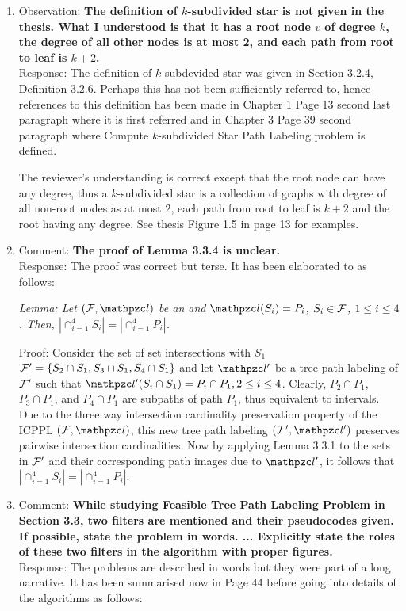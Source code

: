 \documentclass[12pt,a4paper]{article}
\begin{document}
\begin{enumerate}
\item Observation: {\bf The definition of $k$-subdivided star is not
    given in the thesis. What I understood is that it has a root node $v$
    of degree $k$, the degree of all other nodes is at most 2, and
    each path from root to leaf is $k+2$.}\\
Response: The definition of $k$-subdevided star was given in Section
3.2.4, Definition 3.2.6. Perhaps this has not been sufficiently
referred to, hence references to this definition has been made in
Chapter 1 Page 13 second last paragraph where it is first referred and
in Chapter 3 Page 39 second paragraph where {\sc Compute
  $k$-subdivided Star Path Labeling} problem is defined.

The reviewer's understanding is 
correct except that the root node can have any degree, thus a
$k$-subdivided star is a collection of graphs with degree of all
non-root nodes as at most 2, each path from root to leaf is $k+2$ and 
the root having any degree. See thesis Figure 1.5 in page 13 for examples.


\item Comment: {\bf The proof of Lemma 3.3.4 is unclear.}\\
Response: The proof was correct but terse. It has been elaborated to as
follows:

  {\em 
  Lemma:   Let $(\cF, \cl)$ be an \ICPPL and $\cl(S_i)=P_i$, $S_i \in {\cal F}$, $1
  \leq i \leq 4$.  Then, $|\cap_{i=1}^4 S_i| = |\cap_{i=1}^4 P_i|$.

  Proof: Consider the set of set intersections with $S_1$ ${\cal F}' = \{S_2 \cap S_1, S_3
  \cap S_1, S_4 \cap S_1\}$ and let $\cl'$ be a tree path labeling of
  ${\cal F}'$ such that $\cl'(S_i \cap S_1) = P_i \cap P_1, 2 \le i \le
  4$. Clearly, $P_2 \cap P_1$, $P_3 \cap P_1$, and $P_4 \cap P_1$ are
  subpaths of path $P_1$, thus equivalent to intervals.  Due to the
  three way intersection cardinality preservation property of the
  ICPPL $(\cF, \cl)$, this new tree path labeling $(\cF', \cl')$
  preserves pairwise intersection cardinalities.  Now by applying
  Lemma 3.3.1 %
  to the sets in ${\cal F}'$ and
  their corresponding path images due to $\cl'$, it follows that
  $|\cap_{i=1}^4 S_i| =| \cap_{i=1}^4 P_i|$.}


\item Comment: {\bf While studying Feasible Tree Path Labeling Problem
  in Section 3.3, two filters are mentioned and their pseudocodes
  given. If possible, state the problem in words. ... Explicitly state
the roles of these two filters in the algorithm with proper
figures.}\\
Response: The problems are described in words but they were part of a
long narrative. It has been summarised now in Page 44 before going
into details of the algorithms as follows:


\end{enumerate}
\end{document}

